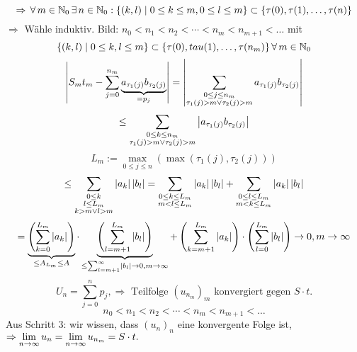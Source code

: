 \documentclass[../ana1.tex]{subfiles}
\begin{document}
\begin{bew}
    \[ \Rightarrow \, \forall \, m\in\mathbb{N}_0 \, \exists \, n\in\mathbb{N}_0 : \{ (k,l) \; \vert \; 0\leq k\leq m, 0\leq l\leq m \} \subset \{ \tau(0), \tau(1), \ldots, \tau(n) \} \]
    \( \Rightarrow \) Wähle induktiv. 
    Bild: 
    \( n_0 < n_1 < n_2 < \cdots < n_m < n_{m+1} < \ldots \) mit 
    \[ \{ (k,l) \; \vert \; 0 \leq k, l \leq m \} \subset \{ \tau(0), tau(1), \ldots , \tau(n_m) \} \, \forall \, m\in\mathbb{N}_0 \]
    \[ \left| S_m t_m - \sum_{j=0}^{n_m} \underbrace{ a_{\tau_1(j)} b_{\tau_2(j)} }_{=p_j} \right| = \left| \sum_{\substack{0\leq j\leq n_m \\ \tau_1(j) > m \vee \tau_2(j) > m}} a_{\tau_1(j)} b_{\tau_2(j)} \right| \]
    \[ \leq \sum_{\substack{0\leq k \leq n_m \\ \tau_1(j) > m \vee \tau_2(j) > m}} \left|a_{\tau_1(j)} b_{\tau_2(j)}\right| \]
    \[ L_m := \underset{0\leq j\leq n}{\max}(\max( \tau_1(j), \tau_2(j) ) ) \]
    \[ \leq \sum_{\substack{0\leq k \\ l\leq L_m \\ k > m \vee l > m}} \left|a_k\right| \left|b_l\right| = \sum_{\substack{0\leq k\leq L_m \\ m<l\leq L_m}} \left|a_k\right|\left|b_l\right| + \sum_{\substack{0\leq l \leq L_m \\ m<k\leq L_m}} \left|a_k\right|\left|b_l\right| \]
    \[ = \underbrace{\left( \sum_{k=0}^{L_m} \left|a_k\right| \right)}_{\leq A_{L_m} \leq A} \cdot \underbrace{\left( \sum_{l=m+1}^{L_m} \left|b_l\right| \right)}_{\leq \sum_{l=m+1}^\infty \left|b_l\right| \rightarrow 0, m\rightarrow \infty} + \left( \sum_{k=m+1}^{L_m} \left|a_k\right| \right) \cdot \left( \sum_{l=0}^{L_m} \left|b_l\right| \right) \rightarrow 0, m\rightarrow\infty \]
    \[ U_n = \sum_{j=0}^n p_j, \Rightarrow \text{ Teilfolge } {(u_{n_m})}_m \text{ konvergiert gegen } S \cdot t. \]
    \[ n_0 < n_1 < n_2 < \cdots < n_m < n_{m+1} < \dots \]
    Aus Schritt 3: wir wissen, dass \( (u_n)_n \) eine konvergente Folge ist, \( \Rightarrow \lim\limits_{n\rightarrow\infty} u_n = \lim\limits_{n\rightarrow\infty} u_{n_m} = S \cdot t. \)
\end{bew}
\end{document}
